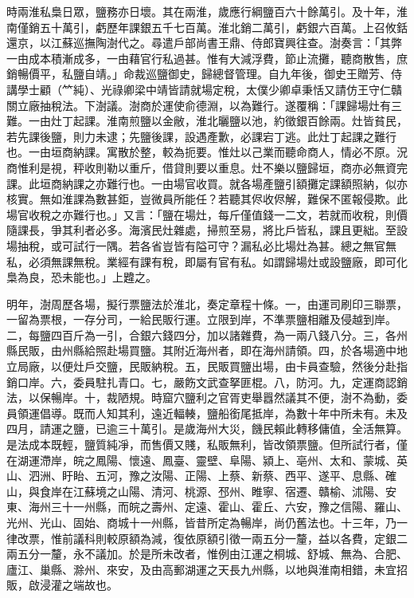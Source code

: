 \begin{pinyinscope}
時兩淮私梟日眾，鹽務亦日壞。其在兩淮，歲應行綱鹽百六十餘萬引。及十年，淮南僅銷五十萬引，虧歷年課銀五千七百萬。淮北銷二萬引，虧銀六百萬。上召攸銛還京，以江蘇巡撫陶澍代之。尋遣戶部尚書王鼎、侍郎寶興往查。澍奏言：「其弊一由成本積漸成多，一由藉官行私過甚。惟有大減浮費，節止流攤，聽商散售，庶銷暢價平，私鹽自靖。」命裁巡鹽御史，歸總督管理。自九年後，御史王贈芳、侍講學士顧（𥫗純）、光祿卿梁中靖皆請就場定稅，太僕少卿卓秉恬又請仿王守仁贛關立廠抽稅法。下澍議。澍商於運使俞德淵，以為難行。遂覆稱：「課歸場灶有三難。一由灶丁起課。淮南煎鹽以金敝，淮北曬鹽以池，約徵銀百餘兩。灶皆貧民，若先課後鹽，則力未逮；先鹽後課，設遇產歉，必課宕丁逃。此灶丁起課之難行也。一由垣商納課。寓散於整，較為扼要。惟灶以己業而聽命商人，情必不原。況商惟利是視，秤收則勒以重斤，借貸則要以重息。灶不樂以鹽歸垣，商亦必無資完課。此垣商納課之亦難行也。一由場官收買。就各場產鹽引額攤定課額照納，似亦核實。無如淮課為數甚鉅，豈微員所能任？若聽其侭收侭解，難保不匿報侵欺。此場官收稅之亦難行也。」又言：「鹽在場灶，每斤僅值錢一二文，若就而收稅，則價隨課長，爭其利者必多。海濱民灶雜處，掃煎至易，將比戶皆私，課且更絀。至設場抽稅，或可試行一隅。若各省豈皆有隘可守？漏私必比場灶為甚。總之無官無私，必須無課無稅。業經有課有稅，即屬有官有私。如謂歸場灶或設鹽廠，即可化梟為良，恐未能也。」上韙之。

明年，澍周歷各場，擬行票鹽法於淮北，奏定章程十條。一，由運司刷印三聯票，一留為票根，一存分司，一給民販行運。立限到岸，不準票鹽相離及侵越到岸。二，每鹽四百斤為一引，合銀六錢四分，加以諸雜費，為一兩八錢八分。三，各州縣民販，由州縣給照赴場買鹽。其附近海州者，即在海州請領。四，於各場適中地立局廠，以便灶戶交鹽，民販納稅。五，民販買鹽出場，由卡員查驗，然後分赴指銷口岸。六，委員駐扎青口。七，嚴飭文武查拏匪棍。八，防河。九，定運商認銷法，以保暢岸。十，裁陋規。時窟穴鹽利之官胥吏舉囂然議其不便，澍不為動，委員領運倡導。既而人知其利，遠近輻輳，鹽船銜尾抵岸，為數十年中所未有。未及四月，請運之鹽，已逾三十萬引。是歲海州大災，饑民賴此轉移傭值，全活無算。是法成本既輕，鹽質純凈，而售價又賤，私販無利，皆改領票鹽。但所試行者，僅在湖運滯岸，皖之鳳陽、懷遠、鳳臺、靈壁、阜陽、潁上、亳州、太和、蒙城、英山、泗洲、盱眙、五河，豫之汝陽、正陽、上蔡、新蔡、西平、遂平、息縣、確山，與食岸在江蘇境之山陽、清河、桃源、邳州、睢寧、宿遷、贛榆、沭陽、安東、海州三十一州縣，而皖之壽州、定遠、霍山、霍丘、六安，豫之信陽、羅山、光州、光山、固始、商城十一州縣，皆昔所定為暢岸，尚仍舊法也。十三年，乃一律改票，惟前議科則較原額為減，復依原額引徵一兩五分一釐，益以各費，定銀二兩五分一釐，永不議加。於是所未改者，惟例由江運之桐城、舒城、無為、合肥、廬江、巢縣、滁州、來安，及由高郵湖運之天長九州縣，以地與淮南相錯，未宜招販，啟浸灌之端故也。


\end{pinyinscope}
